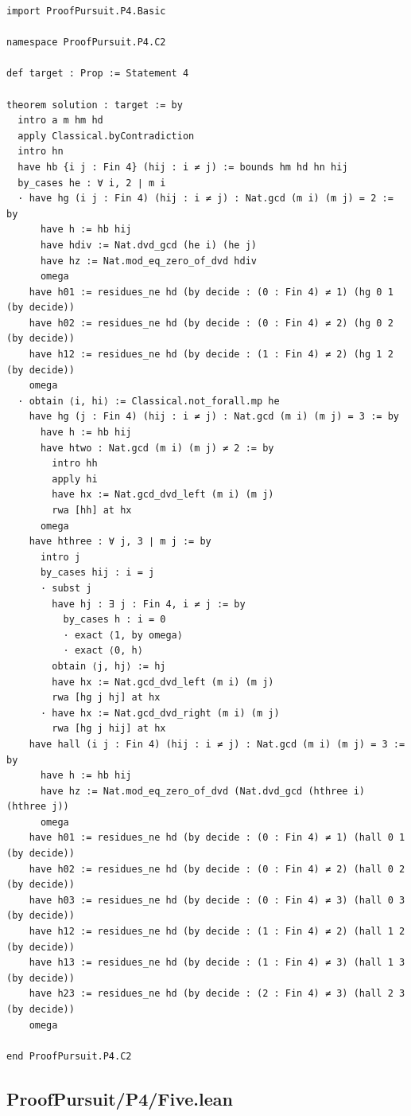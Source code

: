 \documentclass[11pt,a4paper]{article}
\begin{document}
\begin{Verbatim}[breaklines,breakanywhere,fontsize=\footnotesize]
import ProofPursuit.P4.Basic

namespace ProofPursuit.P4.C2

def target : Prop := Statement 4

theorem solution : target := by
  intro a m hm hd
  apply Classical.byContradiction
  intro hn
  have hb {i j : Fin 4} (hij : i ≠ j) := bounds hm hd hn hij
  by_cases he : ∀ i, 2 ∣ m i
  · have hg (i j : Fin 4) (hij : i ≠ j) : Nat.gcd (m i) (m j) = 2 := by
      have h := hb hij
      have hdiv := Nat.dvd_gcd (he i) (he j)
      have hz := Nat.mod_eq_zero_of_dvd hdiv
      omega
    have h01 := residues_ne hd (by decide : (0 : Fin 4) ≠ 1) (hg 0 1 (by decide))
    have h02 := residues_ne hd (by decide : (0 : Fin 4) ≠ 2) (hg 0 2 (by decide))
    have h12 := residues_ne hd (by decide : (1 : Fin 4) ≠ 2) (hg 1 2 (by decide))
    omega
  · obtain ⟨i, hi⟩ := Classical.not_forall.mp he
    have hg (j : Fin 4) (hij : i ≠ j) : Nat.gcd (m i) (m j) = 3 := by
      have h := hb hij
      have htwo : Nat.gcd (m i) (m j) ≠ 2 := by
        intro hh
        apply hi
        have hx := Nat.gcd_dvd_left (m i) (m j)
        rwa [hh] at hx
      omega
    have hthree : ∀ j, 3 ∣ m j := by
      intro j
      by_cases hij : i = j
      · subst j
        have hj : ∃ j : Fin 4, i ≠ j := by
          by_cases h : i = 0
          · exact ⟨1, by omega⟩
          · exact ⟨0, h⟩
        obtain ⟨j, hj⟩ := hj
        have hx := Nat.gcd_dvd_left (m i) (m j)
        rwa [hg j hj] at hx
      · have hx := Nat.gcd_dvd_right (m i) (m j)
        rwa [hg j hij] at hx
    have hall (i j : Fin 4) (hij : i ≠ j) : Nat.gcd (m i) (m j) = 3 := by
      have h := hb hij
      have hz := Nat.mod_eq_zero_of_dvd (Nat.dvd_gcd (hthree i) (hthree j))
      omega
    have h01 := residues_ne hd (by decide : (0 : Fin 4) ≠ 1) (hall 0 1 (by decide))
    have h02 := residues_ne hd (by decide : (0 : Fin 4) ≠ 2) (hall 0 2 (by decide))
    have h03 := residues_ne hd (by decide : (0 : Fin 4) ≠ 3) (hall 0 3 (by decide))
    have h12 := residues_ne hd (by decide : (1 : Fin 4) ≠ 2) (hall 1 2 (by decide))
    have h13 := residues_ne hd (by decide : (1 : Fin 4) ≠ 3) (hall 1 3 (by decide))
    have h23 := residues_ne hd (by decide : (2 : Fin 4) ≠ 3) (hall 2 3 (by decide))
    omega

end ProofPursuit.P4.C2
\end{Verbatim}

\subsection{ProofPursuit/P4/Five.lean}\label{proofpursuitp4five.lean}
\end{document}
